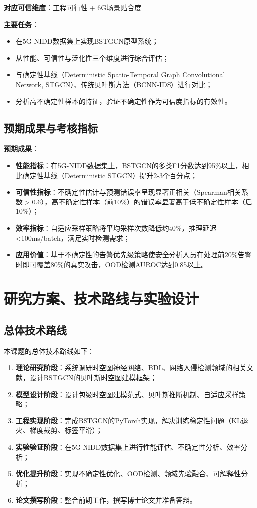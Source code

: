\textbf{对应可信维度}：工程可行性 + 6G场景贴合度

\textbf{主要任务}：

\begin{itemize}
  \item 在5G-NIDD数据集上实现BSTGCN原型系统；
  \item 从性能、可信性与泛化性三个维度进行综合评估；
  \item 与确定性基线（Deterministic Spatio-Temporal Graph Convolutional Network, STGCN）、传统贝叶斯方法（BCNN-IDS）进行对比；
  \item 分析高不确定性样本的特征，验证不确定性作为可信度指标的有效性。
\end{itemize}

\subsection{预期成果与考核指标}

\textbf{预期成果}：

\begin{itemize}
  \item \textbf{性能指标}：在5G-NIDD数据集上，BSTGCN的多类F1分数达到95\%以上，相比确定性基线（Deterministic STGCN）提升2-3个百分点；
  \item \textbf{可信性指标}：不确定性估计与预测错误率呈现显著正相关（Spearman相关系数$>0.6$），高不确定性样本（前10\%）的错误率显著高于低不确定性样本（后10\%）；
  \item \textbf{效率指标}：自适应采样策略将平均采样次数降低约40\%，推理延迟<100ms/batch，满足实时检测需求；
  \item \textbf{应用价值}：基于不确定性的告警优先级策略使安全分析人员在处理前20\%告警时即可覆盖80\%的真实攻击，OOD检测AUROC达到0.85以上。
\end{itemize}

\section{研究方案、技术路线与实验设计}

\subsection{总体技术路线}

本课题的总体技术路线如下：

\begin{enumerate}
  \item \textbf{理论研究阶段}：系统调研时空图神经网络、BDL、网络入侵检测领域的相关文献，设计BSTGCN的贝叶斯时空图建模框架；
  \item \textbf{模型设计阶段}：设计包级时空图建模范式、贝叶斯推断机制、自适应采样策略；
  \item \textbf{工程实现阶段}：完成BSTGCN的PyTorch实现，解决训练稳定性问题（KL退火、梯度裁剪、标签平滑）；
  \item \textbf{实验验证阶段}：在5G-NIDD数据集上进行性能评估、不确定性分析、效率分析；
  \item \textbf{优化提升阶段}：实现不确定性优化、OOD检测、领域先验融合、可解释性分析；
  \item \textbf{论文撰写阶段}：整合前期工作，撰写博士论文并准备答辩。
\end{enumerate}

